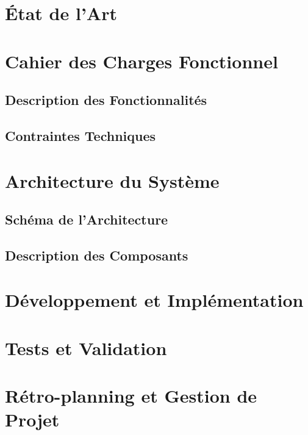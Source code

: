 \documentclass[a4paper,12pt]{report}  %
\begin{document}
	\section{État de l'Art}
	
	\section{Cahier des Charges Fonctionnel}
	\subsection{Description des Fonctionnalités}
	
	\subsection{Contraintes Techniques}
	
	\section{Architecture du Système}
	\subsection{Schéma de l'Architecture}
	
	\subsection{Description des Composants}
	
	\section{Développement et Implémentation}
	
	\section{Tests et Validation}
	
	\section{Rétro-planning et Gestion de Projet}
\end{document}
